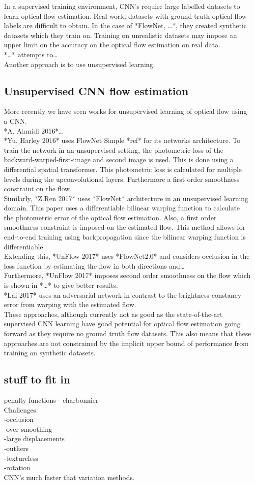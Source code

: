 In a supervised training environment, CNN’s require large labelled datasets to learn optical flow estimation. Real world datasets with ground truth optical flow labels are difficult to obtain. In the case of *FlowNet, …*, they created synthetic datasets which they train on. Training on unrealistic datasets may impose an upper limit on the accuracy on the optical flow estimation on real data. \\
*…* attempts to… \\
Another approach is to use unsupervised learning.\\

\subsection{Unsupervised CNN flow estimation}
More recently we have seen works for unsupervised learning of optical flow using a CNN. \\
*A. Ahmidi 2016*… \\
*Yu. Harley 2016* uses FlowNet Simple *ref* for its networks architecture. To train the network in an unsupervised setting, the photometric loss of the backward-warped-first-image and second image is used. This is done using a differential spatial transformer. This photometric   loss is calculated for multiple levels during the upconvolutional layers. Furthermore a first order smoothness constraint on the flow.\\
Similarly, *Z.Ren 2017* uses *FlowNet* architecture in an unsupervised learning domain. This paper uses a differentiable bilinear warping function to calculate the photometric error of the optical flow estimation. Also, a first order smoothness constraint is imposed on the estimated flow. This method allows for end-to-end training using backpropagation since the bilinear warping function is differentiable.\\
Extending this, *UnFlow 2017* uses *FlowNet2.0* and considers occlusion in the loss function by estimating the flow in both directions and…\\
Furthermore, *UnFlow 2017* imposes second order smoothness on the flow which is shown in *…* to give better results.\\
*Lai 2017* uses an adversarial network in contrast to the brightness constancy error from warping with the estimated flow.\\
These approaches, although currently not as good as the state-of-the-art supervised CNN learning have good potential for optical flow estimation going forward as they require no ground truth flow datasets. This also means that these approaches are not constrained by the implicit upper bound of performance from training on synthetic datasets.\\

\subsection{stuff to fit in}
penalty functions - charbonnier\\
Challenges:\\
-occlusion\\
-over-smoothing\\
-large displacements\\
-outliers\\
-textureless\\
-rotation\\
CNN's much faster that variation methods.\\
